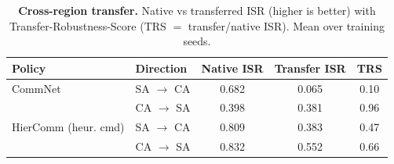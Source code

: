 \begin{table}[t]
\centering
\caption{\textbf{Cross-region transfer.} Native vs transferred ISR (higher is better) with Transfer-Robustness-Score (TRS $=$ transfer/native ISR). Mean over training seeds.}
\label{tab:transfer}
\begin{tabular}{llccc}
\toprule
Policy & Direction & Native ISR & Transfer ISR & TRS \\
\midrule
CommNet & SA $\to$ CA & 0.682 & 0.065 & 0.10 \\
 & CA $\to$ SA & 0.398 & 0.381 & 0.96 \\
\midrule
HierComm (heur. cmd) & SA $\to$ CA & 0.809 & 0.383 & 0.47 \\
 & CA $\to$ SA & 0.832 & 0.552 & 0.66 \\
\bottomrule
\end{tabular}
\end{table}
